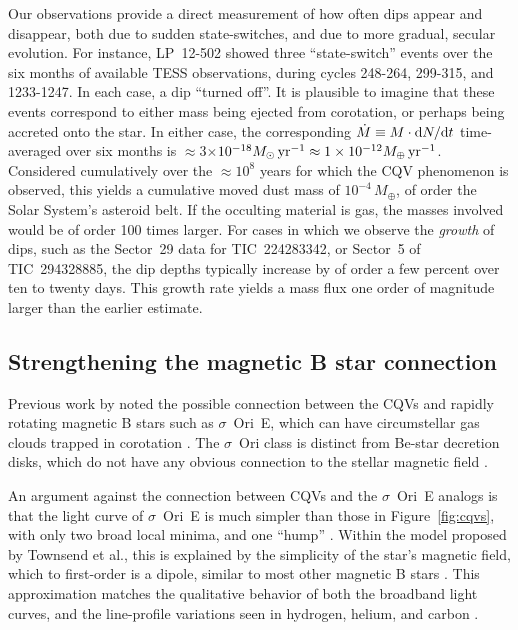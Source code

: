 \documentclass[11pt,twocolumn,tighten]{aastex63}
\begin{document}
Our observations provide a direct measurement of how often dips appear
and disappear, both due to sudden state-switches, and due to more
gradual, secular evolution.  For instance, LP~12-502 showed three
``state-switch'' events over the six months of available TESS
observations, during cycles 248-264, 299-315, and 1233-1247.  In each
case, a dip ``turned off''.  It is plausible to imagine that these
events correspond to either mass being ejected from corotation, or
perhaps being accreted onto the star.  In either case, the
corresponding $\dot{M} \equiv M\cdot {\rm d}N/{\rm d}t$ time-averaged
over six months is $\approx$3$\times$$10^{-18} M_\odot\,{\rm yr}^{-1}
\approx 1\times10^{-12} M_\oplus\,{\rm yr}^{-1}$.  Considered
cumulatively over the $\approx$$10^8$ years for which the CQV
phenomenon is observed, this yields a cumulative moved dust mass of
$10^{-4}\,M_\oplus$, of order the Solar System's asteroid belt.  If
the occulting material is gas, the masses involved would be of order
100 times larger.  For cases in which we observe the {\it growth} of
dips, such as the Sector~29 data for TIC~224283342, or Sector~5 of
TIC~294328885, the dip depths typically increase by of order a few
percent over ten to twenty days.  This growth rate yields a mass flux
one order of magnitude larger than the earlier estimate.


\subsection{Strengthening the magnetic B star connection}

Previous work by \citet{2017AJ....153..152S} noted the possible
connection between the CQVs and rapidly rotating magnetic B stars such
as $\sigma$~Ori~E, which can have circumstellar gas clouds trapped in
corotation \citep{2005ApJ...630L..81T}.  The $\sigma$~Ori class is
distinct from Be-star decretion disks, which do not have any obvious
connection to the stellar magnetic field \citep{2013A&ARv..21...69R}.

An argument against the connection between CQVs and the $\sigma$~Ori~E
analogs is that the light curve of $\sigma$~Ori~E is much simpler than
those in Figure~\ref{fig:cqvs}, with only two broad local minima, and
one ``hump'' \citep{2005ApJ...630L..81T, 2022ApJ...924L..10J}.  Within
the model proposed by Townsend et al., this is explained by the
simplicity of the star's magnetic field, which to first-order is a
dipole, similar to most other magnetic B stars
\citep{2007A&A...475.1053A,2009ARA&A..47..333D}.  This approximation
matches the qualitative behavior of both the broadband light curves,
and the line-profile variations seen in hydrogen, helium, and carbon
\citep{2012MNRAS.419..959O}.
\end{document}
